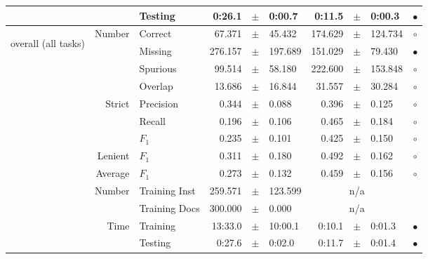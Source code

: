 \begin{longtable}{|r|r|l||rcl|rcl|c|}
\cline{3-10} &                             &         Testing &      0:26.1 &  $\pm$  &      0:00.7 &      0:11.5 &  $\pm$  &      0:00.3 & $\bullet$ \\
\hline
\hline
\multirow{11}{*}{\begin{sideways}overall (all tasks)\end{sideways} }
             & \multirow{4}{*}{    Number} &         Correct &      67.371 &  $\pm$  &      45.432 &     174.629 &  $\pm$  &     124.734 & $\circ$ \\
\cline{3-10} &                             &         Missing &     276.157 &  $\pm$  &     197.689 &     151.029 &  $\pm$  &      79.430 & $\bullet$ \\
\cline{3-10} &                             &        Spurious &      99.514 &  $\pm$  &      58.180 &     222.600 &  $\pm$  &     153.848 & $\circ$ \\
\cline{3-10} &                             &         Overlap &      13.686 &  $\pm$  &      16.844 &      31.557 &  $\pm$  &      30.284 & $\circ$ \\
\cline{2-10} & \multirow{3}{*}{    Strict} &       Precision &       0.344 &  $\pm$  &       0.088 &       0.396 &  $\pm$  &       0.125 & $\circ$ \\
\cline{3-10} &                             &          Recall &       0.196 &  $\pm$  &       0.106 &       0.465 &  $\pm$  &       0.184 & $\circ$ \\
\cline{3-10} &                             &           $F_1$ &       0.235 &  $\pm$  &       0.101 &       0.425 &  $\pm$  &       0.150 & $\circ$ \\
\cline{2-10} &                     Lenient &           $F_1$ &       0.311 &  $\pm$  &       0.180 &       0.492 &  $\pm$  &       0.162 & $\circ$ \\
\cline{2-10} &                     Average &           $F_1$ &       0.273 &  $\pm$  &       0.132 &       0.459 &  $\pm$  &       0.156 & $\circ$ \\
\cline{2-10} & \multirow{2}{*}{    Number} &   Training Inst &     259.571 &  $\pm$  &     123.599 &    \multicolumn{3}{c|}{n/a}         &  \\
\cline{3-10} &                             &   Training Docs &     300.000 &  $\pm$  &       0.000 &    \multicolumn{3}{c|}{n/a}         &  \\
\cline{2-10} & \multirow{2}{*}{      Time} &        Training &     13:33.0 &  $\pm$  &     10:00.1 &      0:10.1 &  $\pm$  &      0:01.3 & $\bullet$ \\
\cline{3-10} &                             &         Testing &      0:27.6 &  $\pm$  &      0:02.0 &      0:11.7 &  $\pm$  &      0:01.4 & $\bullet$ \\
\hline
\end{longtable}

